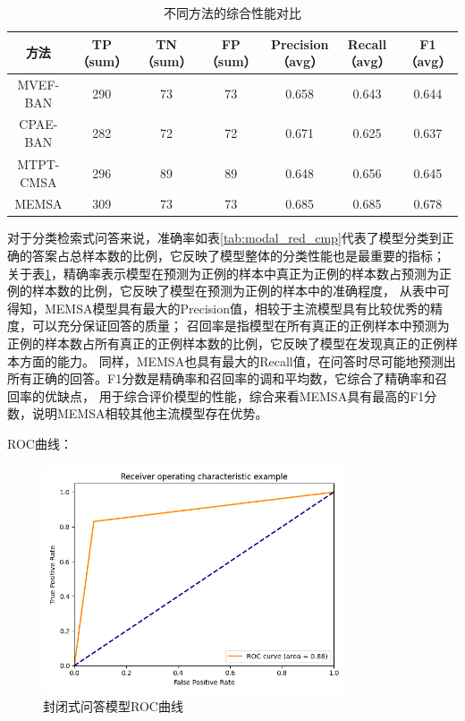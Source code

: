 \begin{table}
	\caption{\label{tab:confusionmatrix}不同方法的综合性能对比}
	\centering
	\small
	\begin{tabular}{c|cccccc}
		\hline  方法 & TP（sum） & TN（sum） & FP（sum） & Precision（avg） & Recall（avg） & F1（avg） \\
		\hline MVEF-BAN & 290 & 73 & 73 & 0.658 & 0.643 & 0.644 \\
		CPAE-BAN & 282 & 72 & 72 & 0.671 & 0.625 & 0.637 \\
		MTPT-CMSA & 296 & 89 & 89 & 0.648 & 0.656 & 0.645 \\
		MEMSA & 309 & 73 & 73 & 0.685 & 0.685 & 0.678 \\
		\hline
		\end{tabular}
\end{table}

对于分类检索式问答来说，准确率如表\ref{tab:modal_red_cmp}代表了模型分类到正确的答案占总样本数的比例，它反映了模型整体的分类性能也是最重要的指标；
关于表\ref{tab:confusionmatrix}，精确率表示模型在预测为正例的样本中真正为正例的样本数占预测为正例的样本数的比例，它反映了模型在预测为正例的样本中的准确程度，
从表中可得知，MEMSA模型具有最大的Precision值，相较于主流模型具有比较优秀的精度，可以充分保证回答的质量；
召回率是指模型在所有真正的正例样本中预测为正例的样本数占所有真正的正例样本数的比例，它反映了模型在发现真正的正例样本方面的能力。
同样，MEMSA也具有最大的Recall值，在问答时尽可能地预测出所有正确的回答。F1分数是精确率和召回率的调和平均数，它综合了精确率和召回率的优缺点，
用于综合评价模型的性能，综合来看MEMSA具有最高的F1分数，说明MEMSA相较其他主流模型存在优势。

ROC曲线：
\begin{figure}[htbp]
	\centering	
	\includegraphics[width=0.8\textwidth]{Fig/myfig/chapter3/all_roc.png}  %
	\caption{\label{all_roc}封闭式问答模型ROC曲线} 
\end{figure}

